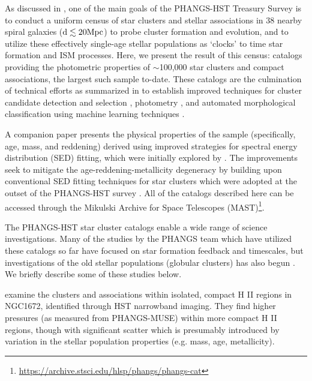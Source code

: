 \documentclass[]{aastex631}
\begin{document}
As discussed in \cite{lee_phangs-hst_2022}, one of the main goals of the PHANGS-HST Treasury Survey is to conduct a uniform census of star clusters and stellar associations in 38 nearby spiral galaxies (${\rm d \lesssim 20 Mpc}$) to probe cluster formation and evolution, and to utilize these effectively single-age stellar populations as `clocks' to time star formation and ISM processes.  Here, we present the result of this census: catalogs providing the photometric properties of $\sim$100,000 star clusters and compact associations, the largest such sample to-date.  These catalogs are the culmination of technical efforts as summarized in \cite{lee_phangs-hst_2022} to establish improved techniques for cluster candidate detection and selection \citep{whitmore_star_2021, thilker_phangs-hst_2022}, photometry \citep{deger_bright_2022}, and automated morphological classification using machine learning techniques \citep{wei_deep_2020, whitmore_star_2021, hannon_star_2023}.  

A companion paper \citep[][hereafter Paper II]{thilker23sed} presents the physical properties of the sample (specifically, age, mass, and reddening) derived using improved strategies for spectral energy distribution (SED) fitting, which were initially explored by \citet{whitmore_improving_2023}.  The improvements seek to mitigate the age-reddening-metallicity degeneracy by building upon conventional SED fitting techniques for star clusters which were adopted at the outset of the PHANGS-HST survey \citep{turner_phangs-hst_2021}.  All of the catalogs described here can be accessed through the Mikulski Archive for Space Telescopes (MAST)\footnote{\url{https://archive.stsci.edu/hlsp/phangs/phangs-cat}}.


The PHANGS-HST star cluster catalogs enable a wide range of science investigations. Many of the studies by the PHANGS team which have utilized these catalogs so far have focused on star formation feedback and timescales, but investigations of the old stellar populations (globular clusters) has also begun \citep{floyd}. We briefly describe some of these studies below.

\citet{barnes_linking_2022} examine the clusters and associations within isolated, compact H II regions in NGC1672, identified through HST narrowband imaging.  They find higher pressures (as measured from PHANGS-MUSE) within more compact H II regions, though with significant scatter which is presumably introduced by variation in the stellar population properties (e.g. mass, age, metallicity). 
\end{document}
